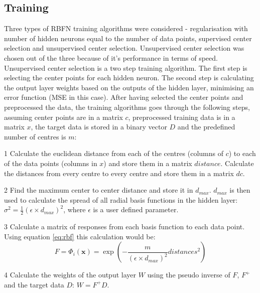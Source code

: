 \documentclass[a4paper, 11pt]{article}
\begin{document}
\subsection{Training}
Three types of RBFN training algorithms were considered - regularisation with number of hidden neurons equal to the number of data points, supervised center selection and unsupervised center selection. Unsupervised center selection was chosen out of the three because of it's performance in terms of speed. Unsupervised center selection is a two step training algorithm. The first step is selecting the center points for each hidden neuron. The second step is  calculating the output layer weights based on the outputs of the hidden layer, minimising an error function (MSE in this case). After having selected the center points and preprocessed the data, the training algorithms goes through the following steps, assuming center points are in a matrix $c$, preprocessed training data is in a matrix $x$, the target data is stored in a binary vector $D$ and the predefined number of centres is $m$:
\begin{list}{•}{•}
\item[1] Calculate the euclidean distance from each of the centres (columns of $c$) to each of the data points (columns in $x$) and store them in a matrix $distance$. Calculate the distances from every centre to every centre and store them in a matrix $dc$.  
\item[2] Find the maximum center to center distance and store it in $d_{max}$. $d_{max}$ is then used to calculate the spread of all radial basis functions in the hidden layer: $\sigma^2 = \frac{1}{2}(\epsilon \times d_{max})^2$, where $\epsilon$ is a user defined parameter. 
\item[3] Calculate a matrix of responses from each basis function to each data point. Using equation \ref{eq:rbf} this calculation would be:
\begin{equation}
F = \Phi_i(\boldsymbol{x}) = \exp\left(-\frac{m}{(\epsilon \times d_{max})^2} distances^2 \right)  
\end{equation}
\item[4] Calculate the weights of the output layer $W$ using the pseudo inverse of $F$, $F^+$ and the target data $D$: $W= F^+D$.
\end{list}
\end{document}

